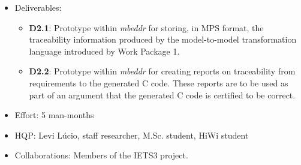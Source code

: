 \begin{itemize}
  \item Deliverables:
  \begin{itemize}
    \item{\textbf{D2.1}:} Prototype within \emph{mbeddr} for storing, in MPS
    format, the traceability information produced by the model-to-model transformation
    language introduced by Work Package 1.
    \item{\textbf{D2.2}:} Prototype within \emph{mbeddr} for creating reports on
    traceability from requirements to the generated C code. These reports are to be used as
    part of an argument that the generated C code is certified to be
    correct.\vspace{.15cm}
  \end{itemize}
  \item Effort: 5 man-months
  \item HQP: Levi L\'ucio, staff researcher, M.Sc. student, HiWi student 
  \item Collaborations: Members of the IETS3 project.
\end{itemize}
